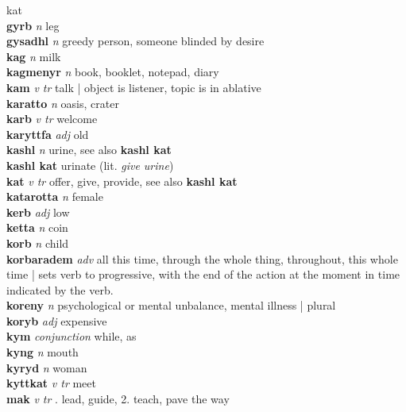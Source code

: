 kat\\\textbf{gyrb}   \emph{n} \textperiodcentered leg\\\textbf{gysadhl}   \emph{n} \textperiodcentered greedy person, someone blinded by desire\\\textbf{kag}   \emph{n} \textperiodcentered milk\\\textbf{kagmenyr}   \emph{n} \textperiodcentered book, booklet, notepad, diary\\\textbf{kam}   \emph{v tr} \textperiodcentered talk | object is listener, topic is in ablative\\\textbf{karatto}   \emph{n} \textperiodcentered oasis, crater\\\textbf{karb}   \emph{v tr} \textperiodcentered welcome\\\textbf{karyttfa}   \emph{adj} \textperiodcentered old\\\textbf{kashl}   \emph{n} \textperiodcentered urine, see also \textbf{kashl kat}\\\textbf{kashl kat}    \textperiodcentered urinate (lit. \emph{give urine})\\\textbf{kat}   \emph{v tr} \textperiodcentered offer, give, provide, see also \textbf{kashl kat}\\\textbf{katarotta}   \emph{n} \textperiodcentered female\\\textbf{kerb}   \emph{adj} \textperiodcentered low\\\textbf{ketta}   \emph{n} \textperiodcentered coin\\\textbf{korb}   \emph{n} \textperiodcentered child\\\textbf{korbaradem}   \emph{adv} \textperiodcentered all this time, through the whole thing, throughout, this whole time | sets verb to progressive, with the end of the action at the moment in time indicated by the verb.\\\textbf{koreny}   \emph{n} \textperiodcentered psychological or mental unbalance, mental illness | plural\\\textbf{koryb}   \emph{adj} \textperiodcentered expensive\\\textbf{kym}   \emph{conjunction} \textperiodcentered while, as\\\textbf{kyng}   \emph{n} \textperiodcentered mouth\\\textbf{kyryd}   \emph{n} \textperiodcentered woman\\\textbf{kyttkat}   \emph{v tr} \textperiodcentered meet\\\textbf{mak}   \emph{v tr} . lead, guide, 2. teach, pave the way 